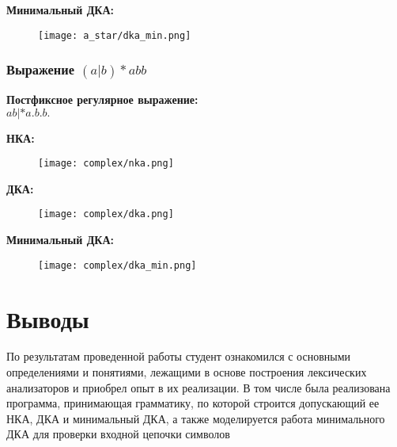 		\textbf{Минимальный ДКА:}
			\begin{figure}[h!]
				\begin{center}
					\texttt{[image: a\_star/dka\_min.png]}
				\end{center}
			\end{figure}

		\subsubsection{Выражение $(a|b)*abb$}
		\textbf{Постфиксное регулярное выражение:}\\
			$ab|*a.b.b.$

		\newpage
		\textbf{НКА:}
			\begin{figure}[h!]
				\begin{center}
					\texttt{[image: complex/nka.png]}
				\end{center}
			\end{figure}

		\newpage
		\textbf{ДКА:}
			\begin{figure}[h!]
				\begin{center}
					\texttt{[image: complex/dka.png]}
				\end{center}
			\end{figure}

		\textbf{Минимальный ДКА:}
			\begin{figure}[h!]
				\begin{center}
					\texttt{[image: complex/dka\_min.png]}
				\end{center}
			\end{figure}


	\newpage
	\section{Выводы}
	
	По результатам проведенной работы студент ознакомился с основными определениями и понятиями, лежащими в основе
		построения лексических анализаторов и приобрел опыт в их реализации.
	В том числе была реализована программа, принимающая грамматику, по которой строится допускающий ее НКА, ДКА и минимальный ДКА, 
		а также моделируется работа минимального ДКА для проверки входной цепочки символов


